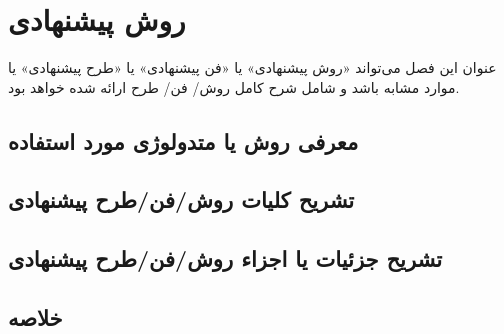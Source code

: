 
\chapter{روش پیشنهادی}\label{chapter:3}
\thispagestyle{empty}

عنوان این فصل می‌تواند «روش پیشنهادی» یا «فن پیشنهادی» یا «طرح پیشنهادی» یا موارد مشابه باشد و شامل شرح كامل روش/ فن/ طرح ارائه شده خواهد بود.


 \section{معرفی روش يا متدولوژی مورد استفاده}
 
 
  \section{تشريح كليات روش/فن/طرح پيشنهادی}
  
  
   \section{تشريح جزئيات يا اجزاء روش/فن/طرح پيشنهادی }
   
   
  
   \section{خلاصه}
   